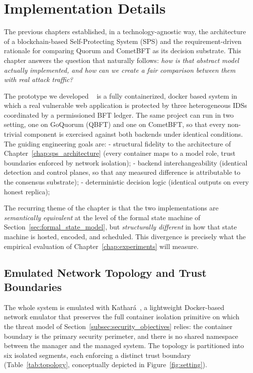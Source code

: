 
\chapter{Implementation Details}
\label{chap:implementation}

The previous chapters established, in a technology-agnostic way, the architecture of a blockchain-based Self-Protecting System (SPS) and the requirement-driven rationale for comparing Quorum and CometBFT as its decision substrate. This chapter answers the question that naturally follows: \emph{how is that abstract model actually implemented, and how can we create a fair comparison between them with real attack traffic?}

The prototype we developed ~\cite{repo} is a fully containerized, docker based system in which a real vulnerable web application is protected by three heterogeneous IDSs coordinated by a permissioned  BFT ledger. The same project can run in two setting, one on GoQuorum (QBFT) and one on CometBFT, so that every non-trivial component is exercised against both backends under identical conditions. The guiding engineering goals are: 
- structural fidelity to the architecture of Chapter~\ref{chap:sps_architecture} (every container maps to a model role, trust boundaries enforced by network isolation); 
- backend interchangeability (identical detection and control planes, so that any measured difference is attributable to the consensus substrate); 
- deterministic decision logic (identical outputs on every honest replica); 

The recurring theme of the chapter is that the two implementations are \emph{semantically equivalent} at the level of the formal state machine of Section~\ref{sec:formal_state_model}, but \emph{structurally different} in how that state machine is hosted, encoded, and scheduled. This divergence is precisely what the empirical evaluation of Chapter~\ref{chap:experiments} will measure.

\section{Emulated Network Topology and Trust Boundaries}
\label{sec:impl_topology}

The whole system is emulated with Kathará~\cite{kathara}, a lightweight Docker-based network emulator that preserves the full container isolation primitive on which the threat model of Section~\ref{subsec:security_objectives} relies: the container boundary is the primary security perimeter, and there is no shared namespace between the manager and the managed system. The topology is partitioned into six isolated segments, each enforcing a distinct trust boundary (Table~\ref{tab:topology}, conceptually depicted in Figure~\ref{fig:setting}).

